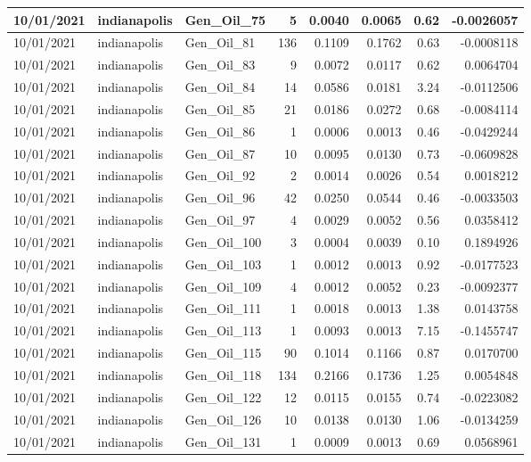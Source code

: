 \documentclass[
  letterpaper,
  DIV=11,
  numbers=noendperiod]{scrartcl}
\begin{document}
\begin{tabular}{l|l|l|r|r|r|r|r}
\hline
10/01/2021 & indianapolis & Gen\_Oil\_75 & 5 & 0.0040 & 0.0065 & 0.62 & -0.0026057\\
\hline
10/01/2021 & indianapolis & Gen\_Oil\_81 & 136 & 0.1109 & 0.1762 & 0.63 & -0.0008118\\
\hline
10/01/2021 & indianapolis & Gen\_Oil\_83 & 9 & 0.0072 & 0.0117 & 0.62 & 0.0064704\\
\hline
10/01/2021 & indianapolis & Gen\_Oil\_84 & 14 & 0.0586 & 0.0181 & 3.24 & -0.0112506\\
\hline
10/01/2021 & indianapolis & Gen\_Oil\_85 & 21 & 0.0186 & 0.0272 & 0.68 & -0.0084114\\
\hline
10/01/2021 & indianapolis & Gen\_Oil\_86 & 1 & 0.0006 & 0.0013 & 0.46 & -0.0429244\\
\hline
10/01/2021 & indianapolis & Gen\_Oil\_87 & 10 & 0.0095 & 0.0130 & 0.73 & -0.0609828\\
\hline
10/01/2021 & indianapolis & Gen\_Oil\_92 & 2 & 0.0014 & 0.0026 & 0.54 & 0.0018212\\
\hline
10/01/2021 & indianapolis & Gen\_Oil\_96 & 42 & 0.0250 & 0.0544 & 0.46 & -0.0033503\\
\hline
10/01/2021 & indianapolis & Gen\_Oil\_97 & 4 & 0.0029 & 0.0052 & 0.56 & 0.0358412\\
\hline
10/01/2021 & indianapolis & Gen\_Oil\_100 & 3 & 0.0004 & 0.0039 & 0.10 & 0.1894926\\
\hline
10/01/2021 & indianapolis & Gen\_Oil\_103 & 1 & 0.0012 & 0.0013 & 0.92 & -0.0177523\\
\hline
10/01/2021 & indianapolis & Gen\_Oil\_109 & 4 & 0.0012 & 0.0052 & 0.23 & -0.0092377\\
\hline
10/01/2021 & indianapolis & Gen\_Oil\_111 & 1 & 0.0018 & 0.0013 & 1.38 & 0.0143758\\
\hline
10/01/2021 & indianapolis & Gen\_Oil\_113 & 1 & 0.0093 & 0.0013 & 7.15 & -0.1455747\\
\hline
10/01/2021 & indianapolis & Gen\_Oil\_115 & 90 & 0.1014 & 0.1166 & 0.87 & 0.0170700\\
\hline
10/01/2021 & indianapolis & Gen\_Oil\_118 & 134 & 0.2166 & 0.1736 & 1.25 & 0.0054848\\
\hline
10/01/2021 & indianapolis & Gen\_Oil\_122 & 12 & 0.0115 & 0.0155 & 0.74 & -0.0223082\\
\hline
10/01/2021 & indianapolis & Gen\_Oil\_126 & 10 & 0.0138 & 0.0130 & 1.06 & -0.0134259\\
\hline
10/01/2021 & indianapolis & Gen\_Oil\_131 & 1 & 0.0009 & 0.0013 & 0.69 & 0.0568961\\

\end{tabular}
\end{document}
